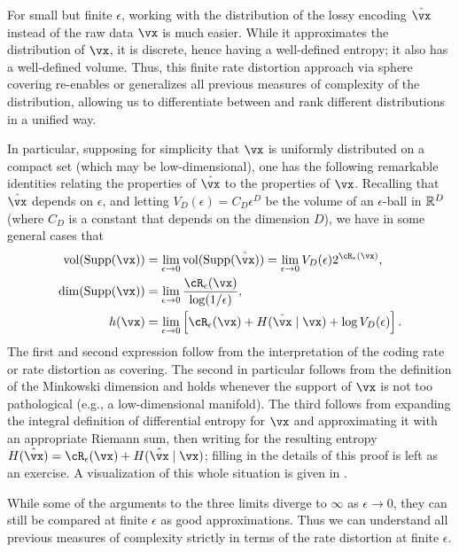 \documentclass[../../book-main.tex]{subfiles}
\begin{document}
\begin{remark}
	For small but finite \(\epsilon\), working with the distribution of the lossy encoding \(\hat \vx\) instead of the raw data \(\vx\) is much easier. While it approximates the distribution of \(\vx\), it is discrete, hence having a well-defined entropy; it also has a well-defined volume. Thus, this finite rate distortion approach via sphere covering re-enables or generalizes all previous measures of complexity of the distribution, allowing us to differentiate between and rank different distributions in a unified way.

	In particular, supposing for simplicity that \(\vx\) is uniformly distributed on a compact set (which may be low-dimensional), one has the following remarkable identities relating the properties of \(\hat{\vx}\) to the properties of \(\vx\). Recalling that \(\hat{\vx}\) depends on \(\epsilon\), and letting \(V_{D}(\epsilon) = C_{D}\epsilon^{D}\) be the volume of an \(\epsilon\)-ball in \(\mathbb{R}^{D}\) (where \(C_{D}\) is a constant that depends on the dimension \(D\)), we have in some general cases that
	\begin{align}
		\operatorname{vol}(\Supp(\vx))
		&= \lim_{\epsilon \to 0}\operatorname{vol}(\Supp(\hat \vx)) = \lim_{\epsilon \to 0}V_{D}(\epsilon)2^{\cR_{\epsilon}(\vx)}, \\
		\dim(\Supp(\vx))
		&= \lim_{\epsilon \to 0}\frac{\cR_{\epsilon}(\vx)}{\log(1/\epsilon)}, \\
		h(\vx)
		&= \lim_{\epsilon \to 0}\bs{\cR_{\epsilon}(\vx) + H(\hat{\vx} \mid \vx) + \log V_{D}(\epsilon)}.
	\end{align}
	The first and second expression follow from the interpretation of the coding rate or rate distortion as covering. The second in particular follows from the definition of the Minkowski dimension \citep{bishop2017fractals} and holds whenever the support of \(\vx\) is not too pathological (e.g., a low-dimensional manifold). The third follows from expanding the integral definition of differential entropy for \(\vx\) and approximating it with an appropriate Riemann sum, then writing for the resulting entropy \(H(\hat{\vx}) = \cR_{\epsilon}(\vx) + H(\hat{\vx} \mid \vx)\); filling in the details of this proof is left as an exercise. A visualization of this whole situation is given in .

	While some of the arguments to the three limits diverge to \(\infty\) as \(\epsilon \to 0\), they can still be compared at finite \(\epsilon\) as good approximations. Thus we can understand all previous measures of complexity strictly in terms of the rate distortion at finite \(\epsilon\).
\end{remark}
\end{document}
